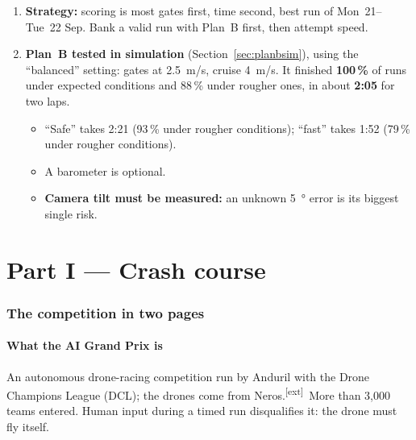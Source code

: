 \documentclass[10pt,a4paper]{article}
\newcommand{\X}{\textsuperscript{\textcolor{ink}{[ext]}}}
\begin{document}
\begin{titlepage}
\begin{takeaway}[Summary]
\begin{enumerate}[leftmargin=1.2em]
\begin{itemize}
\item \textbf{After a one-hour retrain on the corrected simulator:} 10$\times$ fewer crashes under expected conditions, but still only 6--7\,\% two-lap success. A real retrain takes hours (Sections~\ref{sec:stress}--\ref{sec:retrain}).
\end{itemize}
\item \textbf{Strategy:} scoring is most gates first, time second, best run of Mon~21--Tue~22 Sep. Bank a valid run with Plan~B first, then attempt speed.
\item \textbf{Plan~B tested in simulation} (Section~\ref{sec:planbsim}), using the ``balanced'' setting: gates at \SI{2.5}{m/s}, cruise \SI{4}{m/s}. It finished \textbf{100\,\%} of runs under expected conditions and 88\,\% under rougher ones, in about \textbf{2:05} for two laps.
\begin{itemize}
\item ``Safe'' takes 2:21 (93\,\% under rougher conditions); ``fast'' takes 1:52 (79\,\% under rougher conditions).
\item A barometer is optional.
\item \textbf{Camera tilt must be measured:} an unknown \SI{5}{\degree} error is its biggest single risk.
\end{itemize}
\end{enumerate}
\end{takeaway}
\end{titlepage}

\tableofcontents
\newpage


\newpage

\part*{Part I --- Crash course}

\section{The competition in two pages}

\subsection{What the AI Grand Prix is}
An autonomous drone-racing competition run by Anduril with the Drone Champions League (DCL); the drones come from Neros.\X\ More than 3{,}000 teams entered. Human input during a timed run disqualifies it: the drone must fly itself.
\end{document}
